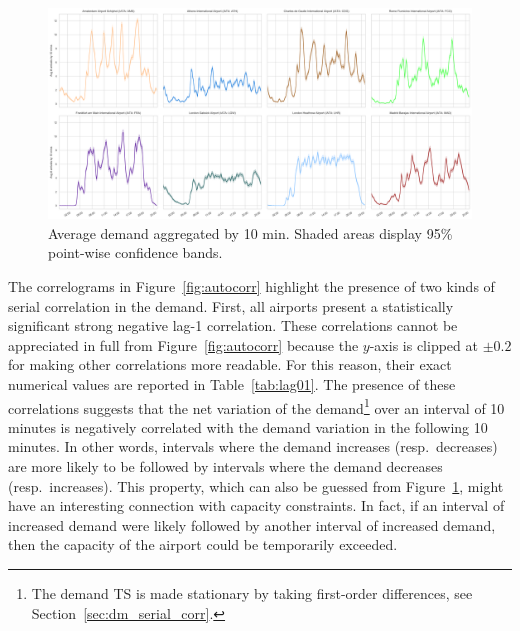 \documentclass[draft,review]{elsarticle}
\begin{document}
\begin{figure}
  \includegraphics[width=\textwidth]{AvgArrivals}
  \caption{Average demand aggregated by 10 min. Shaded areas display 95\% point-wise confidence bands.}\label{fig:AvgArrivals}
\end{figure}

The correlograms in Figure~\ref{fig:autocorr} highlight the presence of two kinds of serial correlation in the demand.
First, all airports present a statistically significant strong negative lag-1 correlation.
These correlations cannot be appreciated in full from Figure~\ref{fig:autocorr} because the \(y\)-axis is clipped at \(\pm 0.2\) for making other correlations more readable. For this reason, their exact numerical values are reported in Table~\ref{tab:lag01}.
The presence of these correlations suggests that the net variation of the demand\footnote{The demand \ac{TS} is made stationary by taking first-order differences, see Section~\ref{sec:dm_serial_corr}.} over an interval of 10 minutes is negatively correlated with the demand variation in the following 10 minutes.
In other words, intervals where the demand increases (resp.\ decreases) are more likely to be followed by intervals where the demand decreases (resp.\ increases).
This property, which can also be guessed from Figure~\ref{fig:AvgArrivals}, might have an interesting connection with capacity constraints.
In fact, if an interval of increased demand were likely followed by another interval of increased demand, then the capacity of the airport could be temporarily exceeded.
\end{document}

